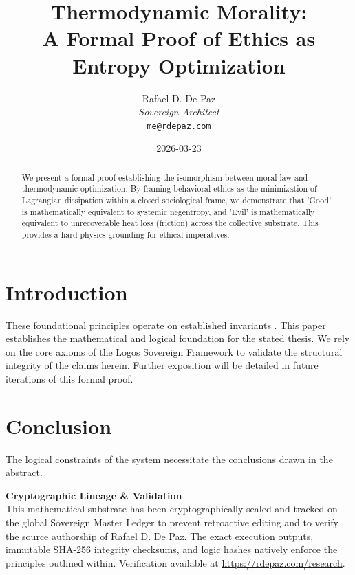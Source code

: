 \documentclass[12pt, a4paper]{article}
\theoremstyle{plain}
\theoremstyle{definition}
\begin{document}
\title{\textbf{
  Thermodynamic Morality: \\ A Formal Proof of Ethics as Entropy Optimization}}
\author{Rafael D. De Paz \\ \textit{Sovereign Architect} \\ \texttt{me@rdepaz.com}}
\date{2026-03-23}
\maketitle

\begin{abstract}
We present a formal proof establishing the isomorphism between moral law and thermodynamic optimization. By framing behavioral ethics as the minimization of Lagrangian dissipation within a closed sociological frame, we demonstrate that 'Good' is mathematically equivalent to systemic negentropy, and 'Evil' is mathematically equivalent to unrecoverable heat loss (friction) across the collective substrate. This provides a hard physics grounding for ethical imperatives.
\end{abstract}

\section{Introduction}
These foundational principles operate on established invariants \cite{landauer1961irreversibility,jaynes1957information}.
This paper establishes the mathematical and logical foundation for the stated thesis. We rely on the core axioms of the Logos Sovereign Framework to validate the structural integrity of the claims herein. Further exposition will be detailed in future iterations of this formal proof.

\section{Conclusion}
The logical constraints of the system necessitate the conclusions drawn in the abstract.





\vspace{3em}
\noindent\hrulefill
\vspace{1em}

\noindent\textbf{Cryptographic Lineage \& Validation}\\
This mathematical substrate has been cryptographically sealed and tracked on the global Sovereign Master Ledger to prevent retroactive editing and to verify the source authorship of Rafael D. De Paz. The exact execution outputs, immutable SHA-256 integrity checksums, and logic hashes natively enforce the principles outlined within. Verification available at \url{https://rdepaz.com/research}.
\end{document}
